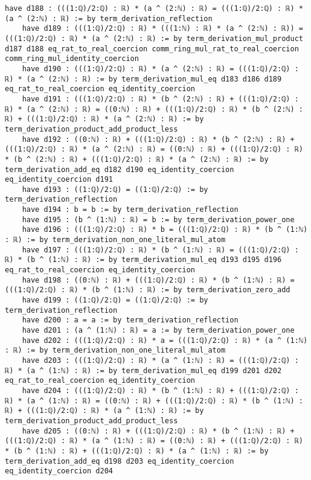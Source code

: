 \documentclass{article}
\begin{document}
\begin{tcolorbox}[colback=white!10, width=\linewidth]
\begin{lstlisting}[language=Lean4]
    have d188 : (((1:ℚ)/2:ℚ) : ℝ) * (a ^ (2:ℕ) : ℝ) = (((1:ℚ)/2:ℚ) : ℝ) * (a ^ (2:ℕ) : ℝ) := by term_derivation_reflection
    have d189 : (((1:ℚ)/2:ℚ) : ℝ) * (((1:ℕ) : ℝ) * (a ^ (2:ℕ) : ℝ)) = (((1:ℚ)/2:ℚ) : ℝ) * (a ^ (2:ℕ) : ℝ) := by term_derivation_mul_product d187 d188 eq_rat_to_real_coercion comm_ring_mul_rat_to_real_coercion comm_ring_mul_identity_coercion
    have d190 : (((1:ℚ)/2:ℚ) : ℝ) * (a ^ (2:ℕ) : ℝ) = (((1:ℚ)/2:ℚ) : ℝ) * (a ^ (2:ℕ) : ℝ) := by term_derivation_mul_eq d183 d186 d189 eq_rat_to_real_coercion eq_identity_coercion
    have d191 : (((1:ℚ)/2:ℚ) : ℝ) * (b ^ (2:ℕ) : ℝ) + (((1:ℚ)/2:ℚ) : ℝ) * (a ^ (2:ℕ) : ℝ) = ((0:ℕ) : ℝ) + (((1:ℚ)/2:ℚ) : ℝ) * (b ^ (2:ℕ) : ℝ) + (((1:ℚ)/2:ℚ) : ℝ) * (a ^ (2:ℕ) : ℝ) := by term_derivation_product_add_product_less
    have d192 : ((0:ℕ) : ℝ) + (((1:ℚ)/2:ℚ) : ℝ) * (b ^ (2:ℕ) : ℝ) + (((1:ℚ)/2:ℚ) : ℝ) * (a ^ (2:ℕ) : ℝ) = ((0:ℕ) : ℝ) + (((1:ℚ)/2:ℚ) : ℝ) * (b ^ (2:ℕ) : ℝ) + (((1:ℚ)/2:ℚ) : ℝ) * (a ^ (2:ℕ) : ℝ) := by term_derivation_add_eq d182 d190 eq_identity_coercion eq_identity_coercion d191
    have d193 : ((1:ℚ)/2:ℚ) = ((1:ℚ)/2:ℚ) := by term_derivation_reflection
    have d194 : b = b := by term_derivation_reflection
    have d195 : (b ^ (1:ℕ) : ℝ) = b := by term_derivation_power_one
    have d196 : (((1:ℚ)/2:ℚ) : ℝ) * b = (((1:ℚ)/2:ℚ) : ℝ) * (b ^ (1:ℕ) : ℝ) := by term_derivation_non_one_literal_mul_atom
    have d197 : (((1:ℚ)/2:ℚ) : ℝ) * (b ^ (1:ℕ) : ℝ) = (((1:ℚ)/2:ℚ) : ℝ) * (b ^ (1:ℕ) : ℝ) := by term_derivation_mul_eq d193 d195 d196 eq_rat_to_real_coercion eq_identity_coercion
    have d198 : ((0:ℕ) : ℝ) + (((1:ℚ)/2:ℚ) : ℝ) * (b ^ (1:ℕ) : ℝ) = (((1:ℚ)/2:ℚ) : ℝ) * (b ^ (1:ℕ) : ℝ) := by term_derivation_zero_add
    have d199 : ((1:ℚ)/2:ℚ) = ((1:ℚ)/2:ℚ) := by term_derivation_reflection
    have d200 : a = a := by term_derivation_reflection
    have d201 : (a ^ (1:ℕ) : ℝ) = a := by term_derivation_power_one
    have d202 : (((1:ℚ)/2:ℚ) : ℝ) * a = (((1:ℚ)/2:ℚ) : ℝ) * (a ^ (1:ℕ) : ℝ) := by term_derivation_non_one_literal_mul_atom
    have d203 : (((1:ℚ)/2:ℚ) : ℝ) * (a ^ (1:ℕ) : ℝ) = (((1:ℚ)/2:ℚ) : ℝ) * (a ^ (1:ℕ) : ℝ) := by term_derivation_mul_eq d199 d201 d202 eq_rat_to_real_coercion eq_identity_coercion
    have d204 : (((1:ℚ)/2:ℚ) : ℝ) * (b ^ (1:ℕ) : ℝ) + (((1:ℚ)/2:ℚ) : ℝ) * (a ^ (1:ℕ) : ℝ) = ((0:ℕ) : ℝ) + (((1:ℚ)/2:ℚ) : ℝ) * (b ^ (1:ℕ) : ℝ) + (((1:ℚ)/2:ℚ) : ℝ) * (a ^ (1:ℕ) : ℝ) := by term_derivation_product_add_product_less
    have d205 : ((0:ℕ) : ℝ) + (((1:ℚ)/2:ℚ) : ℝ) * (b ^ (1:ℕ) : ℝ) + (((1:ℚ)/2:ℚ) : ℝ) * (a ^ (1:ℕ) : ℝ) = ((0:ℕ) : ℝ) + (((1:ℚ)/2:ℚ) : ℝ) * (b ^ (1:ℕ) : ℝ) + (((1:ℚ)/2:ℚ) : ℝ) * (a ^ (1:ℕ) : ℝ) := by term_derivation_add_eq d198 d203 eq_identity_coercion eq_identity_coercion d204

\end{lstlisting}
\end{tcolorbox}
\end{document}
